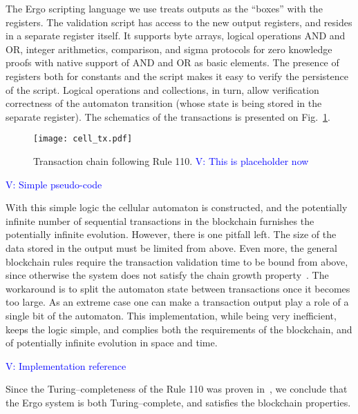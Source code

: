 \documentclass[runningheads]{llncs}
\newcommand{\vk}[1]{\textcolor{blue}{V: {#1}}}
\begin{document}
    The Ergo scripting language we use treats outputs as the ``boxes'' with the
    registers. The validation script has access to the new output registers, and
    resides in a separate register itself. It supports byte arrays, logical
    operations AND and OR, integer arithmetics, comparison, and sigma protocols
    for zero knowledge proofs with native support of AND and OR as basic
    elements. The presence of registers both for constants and the script makes
    it easy to verify the persistence of the script. Logical operations and
    collections, in turn, allow verification correctness of the automaton
    transition (whose state is being stored in the separate register). The
    schematics of the transactions is presented on Fig.~\ref{fig:txs}.

    \begin{figure}[h]
        \centering
        \texttt{[image: cell\_tx.pdf]}
        \caption{Transaction chain following Rule 110. \vk{This is
        placeholder now} \label{fig:txs} }
    \end{figure}

    \vk{Simple pseudo-code}

    With this simple logic the cellular automaton is constructed, and the
    potentially infinite number of sequential transactions in the blockchain
    furnishes the potentially infinite evolution. However, there is one pitfall
    left. The size of the data stored in the output must be limited from above.
    Even more, the general blockchain rules require the transaction validation
    time to be bound from above, since otherwise the system does not satisfy the
    chain growth property~\cite{garay2015bitcoin}. The workaround is to split
    the automaton state between transactions once it becomes too large. As an
    extreme case one can make a transaction output play a role of a single bit
    of the automaton. This implementation, while being very inefficient, keeps
    the logic simple, and complies both the requirements of the blockchain, and
    of potentially infinite evolution in space and time.

    \vk{Implementation reference}

    Since the Turing--completeness of the Rule 110 was proven
    in~\cite{cook2004universality}, we conclude that the Ergo system is
    both Turing--complete, and satisfies the blockchain properties.
\end{document}

